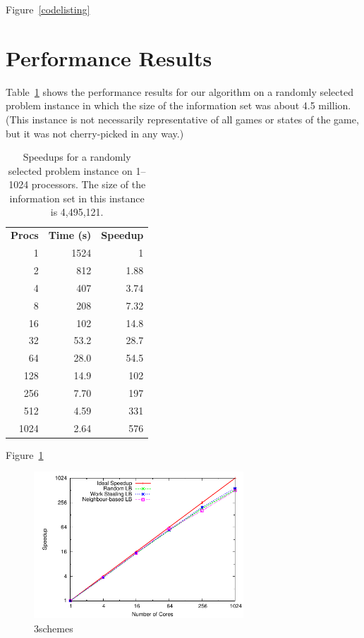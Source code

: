 \documentclass[11pt]{article}
\begin{document}
Figure~\ref{codelisting}

\section{Performance Results}


Table~\ref{speedups} shows the performance results for our algorithm on a randomly selected problem instance in which
the size of the information set was about 4.5 million.  (This instance is not necessarily representative of all games or
states of the game, but it was not cherry-picked in any way.)

\begin{table}
\centering
\begin{tabular}{rrr}
{\bf Procs}	&	{\bf Time (s)} 	&	{\bf Speedup}\\
1	&	1524	&	1\\
2	&	812	&	1.88\\
4	&	407	&	3.74\\
8	&	208	&	7.32\\
16	&	102	&	14.8\\
32	&	53.2	&	28.7\\
64	&	28.0	&	54.5\\
128	&	14.9	&	102\\
256	&	7.70	&	197\\
512	&	4.59	&	331\\
1024	&	2.64	&	576\\
\end{tabular}
\caption{Speedups for a randomly selected problem instance on 1--1024 processors.  The size of the information set in
this instance is 4,495,121.}
\label{speedups}
\end{table}

Figure~\ref{3schemes}
\begin{figure}
\centering
\includegraphics[width=0.7\textwidth]{plots/3schemes.pdf}
\caption{3schemes}
\label{3schemes}
\end{figure}
 
\end{document}
